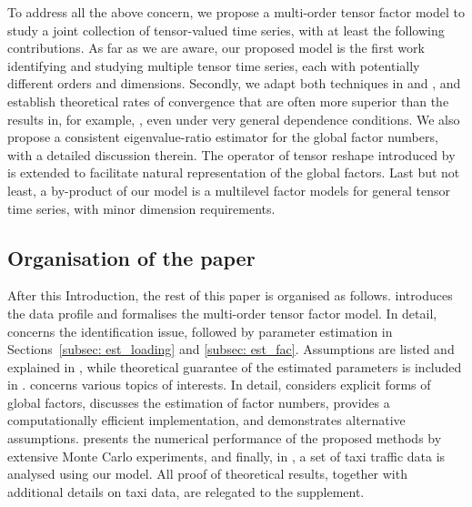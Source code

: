 \documentclass[aos]{imsart}
\theoremstyle{plain}
\theoremstyle{definition}
\begin{document}
To address all the above concern, we propose a multi-order tensor factor model to study a joint collection of tensor-valued time series, with at least the following contributions. As far as we are aware, our proposed model is the first work identifying and studying multiple tensor time series, each with potentially different orders and dimensions. Secondly, we adapt both techniques in \cite{Bai2003} and \cite{Lametal2011}, and establish theoretical rates of convergence that are often more superior than the results in, for example, \cite{Zhangetal2025}, even under very general dependence conditions. We also propose a consistent eigenvalue-ratio estimator for the global factor numbers, with a detailed discussion therein. The operator of tensor reshape introduced by \cite{CenLam2025_KronProd} is extended to facilitate natural representation of the global factors. Last but not least, a by-product of our model is a multilevel factor models for general tensor time series, with minor dimension requirements.



\subsection{Organisation of the paper}
After this Introduction, the rest of this paper is organised as follows.  introduces the data profile and formalises the multi-order tensor factor model. In detail,  concerns the identification issue, followed by parameter estimation in Sections~\ref{subsec: est_loading} and \ref{subsec: est_fac}. Assumptions are listed and explained in , while theoretical guarantee of the estimated parameters is included in .  concerns various topics of interests. In detail,  considers explicit forms of global factors,  discusses the estimation of factor numbers,  provides a computationally efficient implementation, and  demonstrates alternative assumptions.  presents the numerical performance of the proposed methods by extensive Monte Carlo experiments, and finally, in , a set of taxi traffic data is analysed using our model. All proof of theoretical results, together with additional details on taxi data, are relegated to the supplement.
\end{document}

